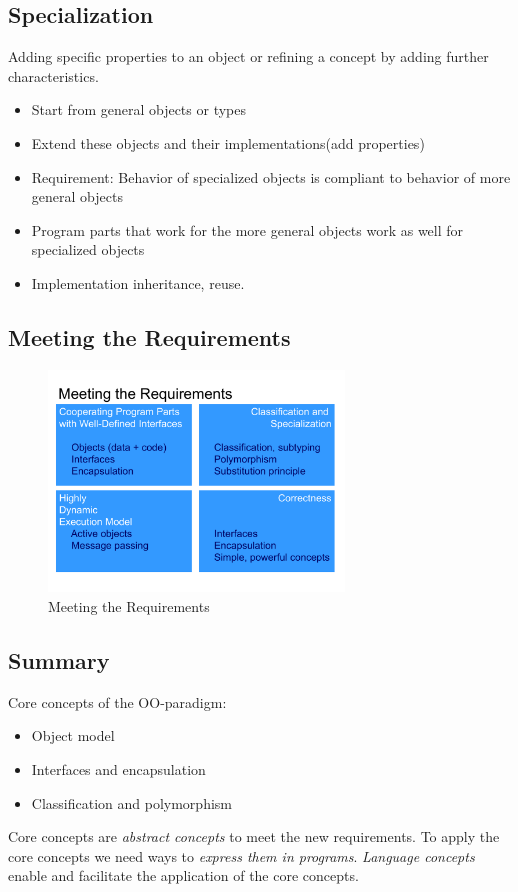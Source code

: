 \subsection{Specialization}
\begin{definition}
 Adding specific properties to an object or refining a concept by adding further characteristics.
\end{definition}
\begin{itemize}
 \item Start from general objects or types
 \item Extend these objects and their implementations(add properties)
 \item Requirement: Behavior of specialized objects is compliant to behavior of more general objects
 \item Program parts that work for the more general objects work as well for specialized objects
 \item Implementation inheritance, reuse.
\end{itemize}

\subsection{Meeting the Requirements}
\begin{figure}[H]
  \centering
    \includegraphics[width=0.7\textwidth]{img/01_meeting_the_requirements}
      \caption{Meeting the Requirements}
\end{figure}

\subsection{Summary}
Core concepts of the OO-paradigm:
\begin{itemize}
 \item Object model
 \item Interfaces and encapsulation
 \item Classification and polymorphism
\end{itemize}
Core concepts are \emph{abstract concepts} to meet the new requirements. To apply the core concepts we need ways to \emph{express them in programs}. \emph{Language concepts} enable and facilitate the application of the core concepts.


